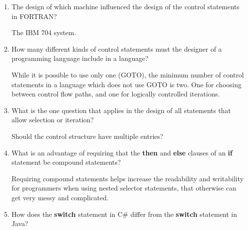 \begin{enumerate}
  \item The design of which machine influenced the design
    of the control statements in FORTRAN?

  \begin{answer}

    The IBM 704 system.

  \end{answer}

  \item How many different kinds of control statements
    must the designer of a programming language include
    in a language?

  \begin{answer}

    While it is possible to use only one (GOTO), the minimum number of control statements in a language which does not use GOTO is two. One for choosing between control flow paths, and one for logically controlled iterations.

  \end{answer}

  \item What is the one question that applies in the
    design of all statements that allow selection or
    iteration?

  \begin{answer}

  	Should the control structure have multiple entries?

  \end{answer}

  \item What is an advantage of requiring that
    the \textbf{then} and \textbf{else} clauses of
    an \textbf{if} statement be compound statements?

  \begin{answer}

  	Requiring compound statements helps increase the readability and writability for programmers when using nested selector statements, that otherwise can get very messy and complicated.

  \end{answer}

  \item How does the \textbf{switch} statement in C\#
    differ from the \textbf{switch} statement in Java?

  \begin{answer}


\end{answer}
\end{enumerate}
